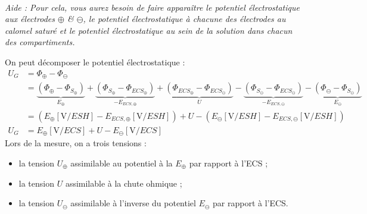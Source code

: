 \documentclass[twoside,a4paper,11pt,addpoints]{exam}%
\begin{document}
\begin{questions}
\begin{mybox}
\\ 
\emph{Aide : Pour cela, vous aurez besoin de faire apparaître le potentiel électrostatique aux électrodes $\oplus$ \& $\ominus$, le potentiel électrostatique à chacune des électrodes au calomel saturé et le potentiel électrostatique au sein de la solution dans chacun des compartiments.}
\begin{solution}[8cm]
On peut décomposer le potentiel électrostatique : 
\begin{align*}
U_G &= \Phi_\oplus - \Phi_\ominus \\
&= \underbrace{(\Phi_\oplus - \Phi_{S_\oplus})}_{E_\oplus} + \underbrace{(\Phi_{S_\oplus} - \Phi_{ECS_\oplus})}_{-E_{ECS,\oplus}} + \underbrace{(\Phi_{ECS_\oplus} - \Phi_{ECS_\ominus})}_{U} - \underbrace{(\Phi_{S_\ominus} - \Phi_{ECS_\ominus})}_{-E_{ECS,\ominus}} - \underbrace{(\Phi_{\ominus} - \Phi_{S_\ominus})}_{E_\ominus} \\
&= (E_\oplus [\si{\volt\per{ESH}}] - E_{ECS, \oplus} [\si{\volt\per{ESH}}]) + U - (E_\ominus [\si{\volt\per{ESH}}] - E_{ECS, \ominus} [\si{\volt\per{ESH}}]) \\
U_G &= E_\oplus [\si{\volt\per{ECS}}] + U - E_\ominus [\si{\volt\per{ECS}}]
\end{align*}
Lors de la mesure, on a trois tensions : 
\begin{itemize}
\item la tension $U_\oplus$ assimilable au potentiel à la $E_\oplus$ par rapport à l'ECS ;
\item la tension $U$ assimilable à la chute ohmique ;
\item la tension $U_\ominus$ assimilable à l'inverse du potentiel $E_\ominus$ par rapport à l'ECS.
\end{itemize}

\end{solution}
\end{mybox}


\end{questions}
\end{document}
